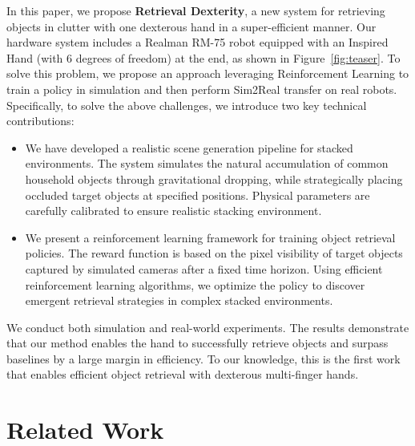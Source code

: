 \documentclass[10pt, a4paper, logo, twocolumn, copyright]{psibot} %
\begin{document}
In this paper, we propose \textbf{Retrieval Dexterity}, a new system for retrieving objects in clutter with one dexterous hand in a super-efficient manner. Our hardware system includes a Realman RM-75 robot equipped with an Inspired Hand (with 6 degrees of freedom) at the end, as shown in Figure~\ref{fig:teaser}. To solve this problem, we propose an approach leveraging Reinforcement Learning to train a policy in simulation and then perform Sim2Real transfer on real robots. Specifically, to solve the above challenges, we introduce two key technical contributions:
\begin{itemize}
    \item We have developed a realistic scene generation pipeline for stacked environments. The system simulates the natural accumulation of common household objects through gravitational dropping, while strategically placing occluded target objects at specified positions. Physical parameters are carefully calibrated to ensure realistic stacking environment.
    \item We present a reinforcement learning framework for training object retrieval policies. The reward function is based on the pixel visibility of target objects captured by simulated cameras after a fixed time horizon. Using efficient reinforcement learning algorithms, we optimize the policy to discover emergent retrieval strategies in complex stacked environments.
\end{itemize}

We conduct both simulation and real-world experiments. The results demonstrate that our method enables the hand to successfully retrieve objects and surpass baselines by a large margin in efficiency. To our knowledge, this is the first work that enables efficient object retrieval with dexterous multi-finger hands.


\section{Related Work}
\end{document}
